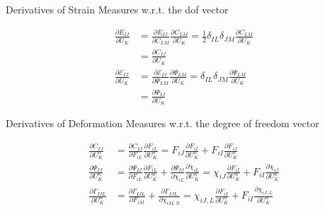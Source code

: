 \documentclass[11pt]{beamer}
\begin{document}
\begin{frame}{Derivatives of Strain Measures w.r.t. the dof vector}

\begin{align*}
\frac{\partial E_{IJ}}{\partial U_{K}} &= \frac{\partial E_{IJ}}{\partial C_{LM}} \frac{\partial C_{LM}}{\partial U_K} = \frac{1}{2}\delta_{IL}\delta_{JM} \frac{\partial C_{LM}}{\partial U_K}\\
&= \frac{\partial C_{IJ}}{\partial U_K}\\
\frac{\partial \mathcal{E}_{IJ}}{\partial U_K} &= \frac{\partial \mathcal{E}_{IJ}}{\partial \Psi_{LM}} \frac{\partial \Psi_{LM}}{\partial U_K} = \delta_{IL}\delta_{JM} \frac{\partial \Psi_{LM}}{\partial U_K}\\
&= \frac{\partial \Psi_{IJ}}{\partial U_K}
\end{align*}

\end{frame}

\begin{frame}{Derivatives of Deformation Measures w.r.t. the degree of freedom vector}

\begin{align*}
\frac{\partial C_{IJ}}{\partial U_{K}^n} &= \frac{\partial C_{IJ}}{\partial F_{iL}}\frac{\partial F_{iL}}{\partial U_{K}^n} = F_{iJ}\frac{\partial F_{iI}}{\partial U_{K}^n} + F_{iI}\frac{\partial F_{iJ}}{\partial U_{K}^n}\\
\frac{\partial \Psi_{IJ}}{\partial U_{K}^n} &= \frac{\partial \Psi_{IJ}}{\partial F_{iL}}\frac{\partial F_{iL}}{\partial U_{K}^n} + \frac{\partial \Psi_{IJ}}{\partial \chi_{iL}}\frac{\partial \chi_{iL}}{\partial U_{K}^n} = \chi_{iJ} \frac{\partial F_{iI}}{\partial U_K^n} + F_{iI} \frac{\partial \chi_{iJ}}{\partial U_K^n}\\
\frac{\partial \Gamma_{IJL}}{\partial U_K^n} &= \frac{\partial \Gamma_{IJL}}{\partial F_{iM}} + \frac{\partial \Gamma_{IJL}}{\partial \chi_{iM,N}} =\chi_{iJ,L}\frac{\partial F_{iI}}{\partial U_K^n} + F_{iI}\frac{\partial \chi_{iJ,L}}{\partial U_K^n}\\
\end{align*}


\end{frame}
\end{document}
